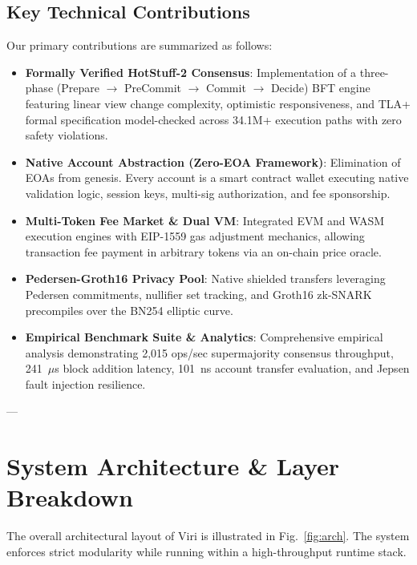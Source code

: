 \documentclass[10pt,journal,compsoc,twocolumn]{IEEEtran}
\begin{document}
\subsection{Key Technical Contributions}
Our primary contributions are summarized as follows:
\begin{itemize}
    \item \textbf{Formally Verified HotStuff-2 Consensus}: Implementation of a three-phase (Prepare $\rightarrow$ PreCommit $\rightarrow$ Commit $\rightarrow$ Decide) BFT engine featuring linear view change complexity, optimistic responsiveness, and TLA+ formal specification model-checked across 34.1M+ execution paths with zero safety violations.
    \item \textbf{Native Account Abstraction (Zero-EOA Framework)}: Elimination of EOAs from genesis. Every account is a smart contract wallet executing native validation logic, session keys, multi-sig authorization, and fee sponsorship.
    \item \textbf{Multi-Token Fee Market \& Dual VM}: Integrated EVM and WASM execution engines with EIP-1559 gas adjustment mechanics, allowing transaction fee payment in arbitrary tokens via an on-chain price oracle.
    \item \textbf{Pedersen-Groth16 Privacy Pool}: Native shielded transfers leveraging Pedersen commitments, nullifier set tracking, and Groth16 zk-SNARK precompiles over the BN254 elliptic curve.
    \item \textbf{Empirical Benchmark Suite \& Analytics}: Comprehensive empirical analysis demonstrating 2,015 ops/sec supermajority consensus throughput, 241~$\mu$s block addition latency, 101~ns account transfer evaluation, and Jepsen fault injection resilience.
\end{itemize}

---

\section{System Architecture \& Layer Breakdown}
\label{sec:architecture}

The overall architectural layout of Viri is illustrated in Fig.~\ref{fig:arch}. The system enforces strict modularity while running within a high-throughput runtime stack.
\end{document}
